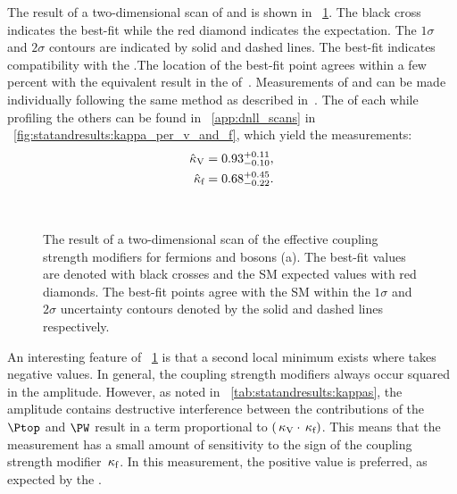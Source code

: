 The result of a two-dimensional \DNLL scan of \kf and \kV is shown in \Fig~\ref{fig:statandresults:kappa_plots_kvkf}. The black cross indicates the best-fit while the red diamond indicates the \SM expectation. The $1\sigma$ and $2\sigma$ contours are indicated by solid and dashed lines. The best-fit indicates compatibility with the \SM.The location of the best-fit point agrees within a few percent with the equivalent result in the \App of~\cite{CMS-PAS-HIG-16-020}. Measurements of \kf and \kV can be made individually following the same method as described in~. The \DNLL of each \POI while profiling the others can be found in \App~\ref{app:dnll_scans} in \Fig~\ref{fig:statandresults:kappa_per_v_and_f}, which yield the measurements:
\begin{equation*}
\begin{split}
\hat{\kappa}_{\text{V}} = 0.93^{+0.11}_{-0.10}, \\
\hat{\kappa}_{\text{f}} = 0.68^{+0.45}_{-0.22}.
\end{split}
\end{equation*}

\begin{figure}[ht!]
\centering
{}\\
\caption{The result of a two-dimensional \DNLL scan of the effective coupling strength modifiers for fermions and bosons (a). The best-fit values are denoted with black crosses and the SM expected values with red diamonds. The best-fit points agree with the SM within the $1\sigma$ and $2\sigma$ uncertainty contours denoted by the solid and dashed lines respectively.}
\label{fig:statandresults:kappa_plots_kvkf}
\end{figure}

An interesting feature of \Fig~\ref{fig:statandresults:kappa_plots_kvkf} is that a second local minimum exists where \kf takes negative values. In general, the coupling strength modifiers always occur squared in the amplitude. However, as noted in \Table~\ref{tab:statandresults:kappas}, the \Hgg amplitude contains destructive interference between the contributions of the $\Ptop$ and $\PW$ result in a term proportional to $(\,\kappa_\text{V}\cdot\,\kappa_\text{f})$. This means that the measurement has a small amount of sensitivity to the sign of the coupling strength modifier $\,\kappa_\text{f}$. In this measurement, the positive value is preferred, as expected by the \SM.



